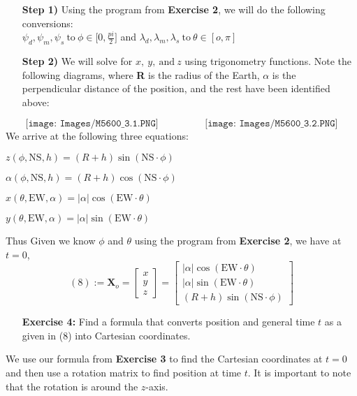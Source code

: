 \documentclass[11pt]{article}
\theoremstyle{definition}
\newcommand{\1}[1]{\mathbf{1} \left \{ #1 \right \}}
\begin{document}
\begin{itemize}
\item[{\textbf{Step 1)}}] Using the program from \textbf{Exercise 2}, we will do the following conversions: \\
\(\psi_d, \psi_m, \psi_s \ \textrm{to} \ \phi \in \big[0, \frac{pi}{2}\big]\) \qquad and \qquad \(\lambda_d, \lambda_m, \lambda_s \ \textrm{to} \ \theta \in [o, \pi]\)

\item[{\textbf{Step 2)}}] We will solve for $x, \ y, \ \textrm{and} \ z$ using trigonometry functions.  Note the following diagrams, where \textbf{R} is the radius of the Earth, $\alpha$ is the perpendicular distance of the position, and the rest have been identified above:
\end{itemize}
\[\texttt{[image: Images/M5600\_3.1.PNG]} \hspace{2cm} \texttt{[image: Images/M5600\_3.2.PNG]}\]
We arrive at the following three equations:
\begin{itemize}
\begin{multicols}{2}
    \item \(z(\phi, \textrm{NS}, h) = (R + h) \sin (\textrm{NS} \cdot \phi)\)
    \item \(\alpha(\phi, \textrm{NS}, h) = (R + h) \cos (\textrm{NS} \cdot \phi)\)
    \item \(x(\theta, \textrm{EW}, \alpha) = |\alpha| \cos (\textrm{EW} \cdot \theta)\)
    \item \(y(\theta, \textrm{EW}, \alpha) = |\alpha| \sin (\textrm{EW} \cdot \theta) \)
\end{multicols}
\end{itemize}
Thus Given we know $\phi$ and $\theta$ using the program from \textbf{Exercise 2}, we have at $t=0$,
\[(8):= \textbf{X}_o = \begin{bmatrix} x \\ y \\ z \end{bmatrix} = \begin{bmatrix}
|\alpha| \cos (\textrm{EW} \cdot \theta) \\ |\alpha| \sin (\textrm{EW} \cdot \theta) \\ (R + h) \sin (\textrm{NS} \cdot \phi) \end{bmatrix}\]

\begin{itemize}
\item[{\textbf{Exercise 4:}}] Find a formula that converts position and general time $t$ as a given in (8) into Cartesian coordinates.
\end{itemize}
We use our formula from \textbf{Exercise 3} to find the Cartesian coordinates at $t=0$ and then use a rotation matrix to find position at time $t$.  It is important to note that the rotation is around the $z$-axis.
\end{document}
